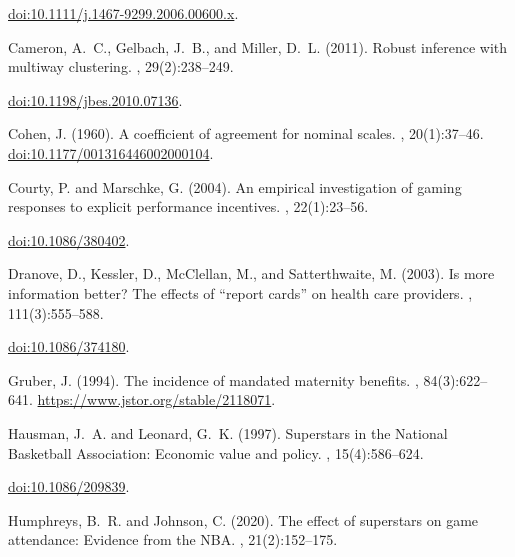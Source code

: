 \documentclass[11pt]{article}
\begin{document}
\begin{thebibliography}{}
\newblock \href{https://doi.org/10.1111/j.1467-9299.2006.00600.x}{doi:10.1111/j.1467-9299.2006.00600.x}.\par
{}
Cameron, A.~C., Gelbach, J.~B., and Miller, D.~L. (2011).
\newblock Robust inference with multiway clustering.
, 29(2):238--249.

\newblock \href{https://doi.org/10.1198/jbes.2010.07136}{doi:10.1198/jbes.2010.07136}.\par
{}
Cohen, J. (1960).
\newblock A coefficient of agreement for nominal scales.
, 20(1):37--46.
\newblock \href{https://doi.org/10.1177/001316446002000104}{doi:10.1177/001316446002000104}.\par

Courty, P. and Marschke, G. (2004).
\newblock An empirical investigation of gaming responses to explicit
  performance incentives.
, 22(1):23--56.

\newblock \href{https://doi.org/10.1086/380402}{doi:10.1086/380402}.\par
{}
Dranove, D., Kessler, D., McClellan, M., and Satterthwaite, M. (2003).
\newblock Is more information better? The effects of ``report cards'' on health
  care providers.
, 111(3):555--588.

\newblock \href{https://doi.org/10.1086/374180}{doi:10.1086/374180}.\par
{}
Gruber, J. (1994).
\newblock The incidence of mandated maternity benefits.
, 84(3):622--641.
\newblock \url{https://www.jstor.org/stable/2118071}.\par

Hausman, J.~A. and Leonard, G.~K. (1997).
\newblock Superstars in the National Basketball Association: Economic value and
  policy.
, 15(4):586--624.

\newblock \href{https://doi.org/10.1086/209839}{doi:10.1086/209839}.\par
{}
Humphreys, B.~R. and Johnson, C. (2020).
\newblock The effect of superstars on game attendance: Evidence from the NBA.
, 21(2):152--175.


\end{thebibliography}
\end{document}
